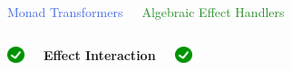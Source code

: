 \documentclass[xcolor=pdftex,dvipsnames,table]{beamer}
\def\checkmark{\includegraphics[height=0.5cm]{checkmark.png}}
\begin{document}
\begin{frame}
  \begin{columns}[c]
    \begin{center}
      \Large{\textcolor{RoyalBlue}{Monad Transformers}}
    \end{center}
    \begin{center}
      \Large{\textcolor{ForestGreen}{Algebraic Effect Handlers}}
    \end{center}
  \end{columns}
  \bigskip
  \bigskip
  \begin{columns}[c]
    \begin{center}
      \checkmark
    \end{center}
    \begin{center}
      \textbf{Effect Interaction}
    \end{center}
    \begin{center}
      \checkmark
    \end{center}
  \end{columns}
\end{frame}


\begin{thebibliography}{5}
\end{thebibliography}

\end{document}
